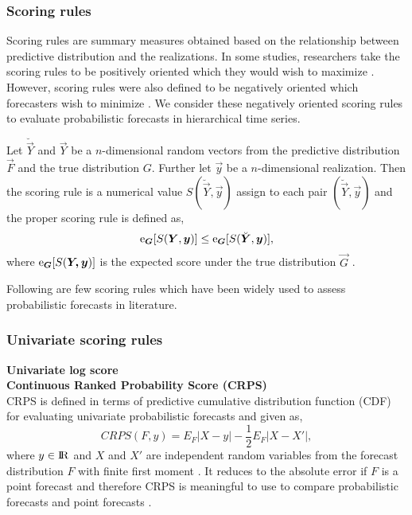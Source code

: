 \documentclass[graybox]{svmult}
\begin{document}
\subsubsection{Scoring rules}

Scoring rules are summary measures obtained based on the relationship between predictive distribution and the realizations. In some studies, researchers take the scoring rules to be positively oriented which they would wish to maximize \cite{Gneiting2007}. However, scoring rules were also defined to be negatively oriented which forecasters wish to minimize \cite{Gneiting2014}. We consider these negatively oriented scoring rules to evaluate probabilistic forecasts in hierarchical time series.

Let $\breve{\vec{Y}}$ and $\vec{Y}$ be a $n$-dimensional random vectors from the predictive distribution $\vec{F}$ and the true distribution ${G}$. Further let $\vec{y}$ be a $n$-dimensional realization. Then the scoring rule is a numerical value $S(\breve{\vec{Y}},\vec{y})$ assign to each pair $(\breve{\vec{Y}},\vec{y})$ and the proper scoring rule is defined as,
\begin{equation}\label{eq:(3.1.)}
\E_{\vec{G}}[S(\vec{Y},\vec{y})] \le \E_{\vec{G}}[S(\breve{\vec{Y}},\vec{y})],
\end{equation}
where $\E_{\vec{G}}[S(\vec{Y,y})]$ is the expected score under the true distribution $\vec{G}$ \cite{gneiting2008, Gneiting2014}.


Following are few scoring rules which have been widely used to assess probabilistic forecasts in literature. \\

\subsubsection{Univariate scoring rules}

\textbf{Univariate log score}\\

\textbf{Continuous Ranked Probability Score (CRPS)}\\


CRPS is defined in terms of predictive cumulative distribution function (CDF) for evaluating univariate probabilistic forecasts and given as,
\begin{equation}
CRPS(F,y)=E_F\left| X-y\right|-\frac{1}{2}E_F\left|X-X'\right|,
\end{equation}
where $y \in \rm I\!R$ and $X$ and $X'$ are independent random variables from the forecast distribution $F$ with finite first moment \cite{Gneiting2007}. It reduces to the absolute error if \(F\) is a point forecast and therefore CRPS is meaningful to use to compare probabilistic forecasts and point forecasts \cite{Gneiting2014}. \\
\end{document}
